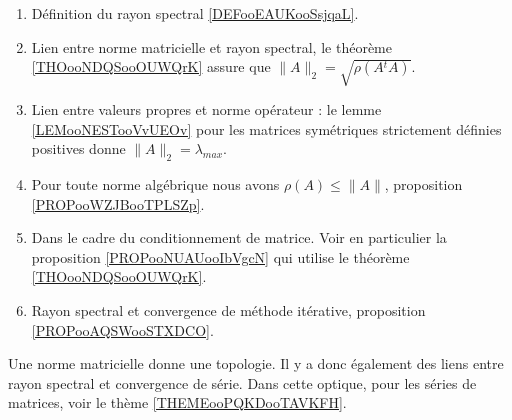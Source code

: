              \label{THEMEooOJJFooWMSAtL}

    \begin{enumerate}
        \item
            Définition du rayon spectral \ref{DEFooEAUKooSsjqaL}.
        \item
            Lien entre norme matricielle et rayon spectral, le théorème \ref{THOooNDQSooOUWQrK} assure que $\|A\|_2=\sqrt{\rho(A{^t}A)}$.
        \item
            Lien entre valeurs propres et norme opérateur : le lemme \ref{LEMooNESTooVvUEOv} pour les matrices symétriques strictement définies positives donne \( \| A \|_2=\lambda_{max}\).
        \item
            Pour toute norme algébrique nous avons \( \rho(A)\leq \| A \|\), proposition \ref{PROPooWZJBooTPLSZp}.
        \item
            Dans le cadre du conditionnement de matrice. Voir en particulier la proposition \ref{PROPooNUAUooIbVgcN} qui utilise le théorème \ref{THOooNDQSooOUWQrK}.
        \item
            Rayon spectral et convergence de méthode itérative, proposition \ref{PROPooAQSWooSTXDCO}.
    \end{enumerate}

    Une norme matricielle donne une topologie. Il y a donc également des liens entre rayon spectral et convergence de série. Dans cette optique, pour les séries de matrices, voir le thème \ref{THEMEooPQKDooTAVKFH}.

